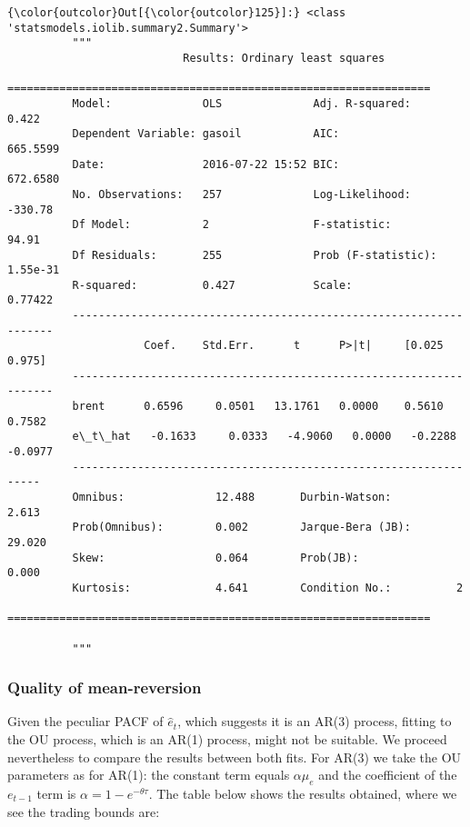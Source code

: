 \documentclass{article}
\begin{document}
            \begin{Verbatim}[commandchars=\\\{\}]
{\color{outcolor}Out[{\color{outcolor}125}]:} <class 'statsmodels.iolib.summary2.Summary'>
          """
                           Results: Ordinary least squares
          =================================================================
          Model:              OLS              Adj. R-squared:     0.422   
          Dependent Variable: gasoil           AIC:                665.5599
          Date:               2016-07-22 15:52 BIC:                672.6580
          No. Observations:   257              Log-Likelihood:     -330.78 
          Df Model:           2                F-statistic:        94.91   
          Df Residuals:       255              Prob (F-statistic): 1.55e-31
          R-squared:          0.427            Scale:              0.77422 
          -------------------------------------------------------------------
                     Coef.    Std.Err.      t      P>|t|     [0.025    0.975]
          -------------------------------------------------------------------
          brent      0.6596     0.0501   13.1761   0.0000    0.5610    0.7582
          e\_t\_hat   -0.1633     0.0333   -4.9060   0.0000   -0.2288   -0.0977
          -----------------------------------------------------------------
          Omnibus:              12.488       Durbin-Watson:          2.613 
          Prob(Omnibus):        0.002        Jarque-Bera (JB):       29.020
          Skew:                 0.064        Prob(JB):               0.000 
          Kurtosis:             4.641        Condition No.:          2     
          =================================================================
          
          """
\end{Verbatim}
        
    \subsubsection{Quality of
mean-reversion}\label{quality-of-mean-reversion}

    Given the peculiar PACF of \(\hat{e}_t\), which suggests it is an AR(3)
process, fitting to the OU process, which is an AR(1) process, might not
be suitable. We proceed nevertheless to compare the results between both
fits. For AR(3) we take the OU parameters as for AR(1): the constant
term equals \(\alpha \mu_e\) and the coefficient of the \(e_{t-1}\) term
is \(\alpha = 1 - e^{-\theta \tau}\). The table below shows the results
obtained, where we see the trading bounds are:
\end{document}
